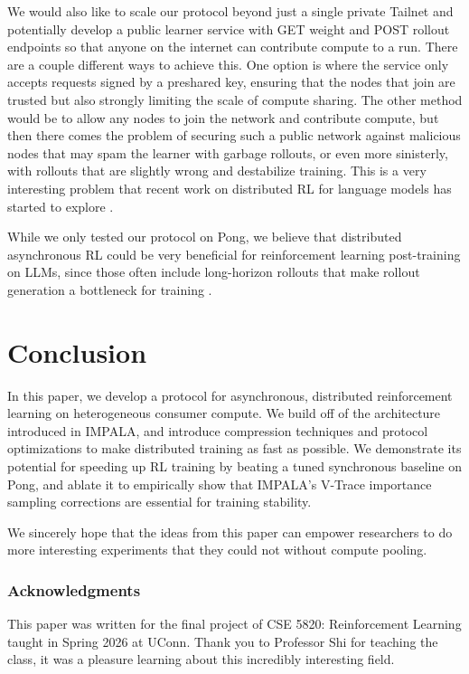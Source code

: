 \documentclass{article}
\begin{document}
We would also like to scale our protocol beyond just a single private Tailnet and potentially develop
a public learner service with GET weight and POST rollout endpoints so that anyone on the internet can
contribute compute to a run. There are a couple different ways to achieve this. One option is
where the service only accepts requests signed by a preshared key, ensuring that the nodes that join
are trusted but also strongly limiting the scale of compute sharing. The other method would be to allow
any nodes to join the network and contribute compute, but then there comes the problem of securing such a
public network against malicious nodes that may spam the learner with garbage rollouts, or even more
sinisterly, with rollouts that are slightly wrong and destabilize training. This is a very interesting
problem that recent work on distributed RL for language models has started to explore \cite{primerl2025}.

While we only tested our protocol on Pong, we believe that distributed asynchronous RL could be very
beneficial for reinforcement learning post-training on LLMs, since those often include long-horizon rollouts
that make rollout generation a bottleneck for training \cite{primerl2025}.


\section{Conclusion}
In this paper, we develop a protocol for asynchronous, distributed reinforcement learning on heterogeneous
consumer compute. We build off of the architecture introduced in IMPALA, and introduce compression
techniques and protocol optimizations to make distributed training as fast as possible.
We demonstrate its potential for speeding up RL training by beating a tuned synchronous
baseline on Pong, and ablate it to empirically show that IMPALA's V-Trace importance sampling corrections
are essential for training stability.

We sincerely hope that the ideas from this paper can empower researchers to do more interesting experiments
that they could not without compute pooling.


\subsubsection*{Acknowledgments}
This paper was written for the final project of CSE 5820: Reinforcement Learning taught in Spring 2026 at
UConn. Thank you to Professor Shi for teaching the class, it was a pleasure learning about this incredibly
interesting field.
\end{document}
